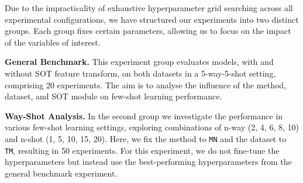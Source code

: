 Due to the impracticality of exhaustive hyperparameter grid searching across all experimental configurations, 
we have structured our experiments into two distinct groups. Each group fixes certain parameters, allowing us to focus on the impact of the variables of interest.

\textbf{General Benchmark.} This experiment group evaluates models, with and without SOT feature transform, on both datasets in a 5-way-5-shot setting, 
comprising 20 experiments. The aim is to analyse the influence of the method, dataset, and SOT module on few-shot learning performance.

\textbf{Way-Shot Analysis.} In the second group we investigate the performance in various few-shot learning settings, exploring combinations of n-way ({2, 4, 6, 8, 10}) and n-shot ({1, 5, 10, 15, 20}). Here, we fix the method to \texttt{MN} and the dataset to \texttt{TM}, resulting in 50 experiments. For this experiment, we do not fine-tune the hyperparameters but instead use the best-performing hyperparameters from the general benchmark experiment.
